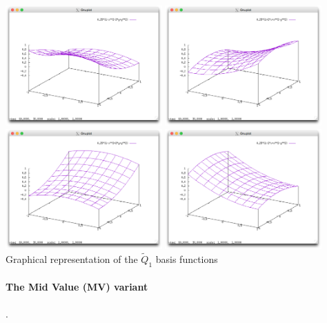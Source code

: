 \begin{center}
\includegraphics[width=6cm]{images/rannacherturek/N1}
\includegraphics[width=6cm]{images/rannacherturek/N2}\\
\includegraphics[width=6cm]{images/rannacherturek/N3}
\includegraphics[width=6cm]{images/rannacherturek/N4}\\
{\captionfont Graphical representation of the $\tilde{Q}_1$ basis functions}
\end{center}

\paragraph{The Mid Value (MV) variant}. 

